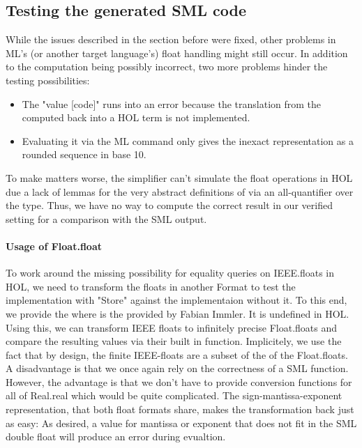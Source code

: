 \documentclass[11pt,a4paper]{article}
\begin{document}
\subsection {Testing the generated SML code}
While the issues described in the section before were fixed, other problems in ML's (or another target language's) float handling might still occur. In addition to the computation being possibly incorrect, two more problems hinder the testing possibilities:
\begin{itemize}
\item The "value [code]" runs into an error because the translation from the computed \MLreal back into a HOL term is not implemented.
\item Evaluating it via the ML command only gives the inexact representation as a rounded sequence in base 10.
\end{itemize}
To make matters worse, the simplifier can't simulate the float operations in HOL due a lack of lemmas for the very abstract definitions of
via an all-quantifier over the \HOLreal type. Thus, we have no way to compute the correct result in our verified setting for a comparison with the SML output.

\paragraph {Usage of Float.float}

To work around the missing possibility for equality queries on IEEE.floats in HOL, we need to transform the floats in another Format to test the implementation with "Store" against the implementaion without it. To this end, we provide the
where
is the
provided by Fabian Immler. It is undefined in HOL. Using this, we can transform IEEE floats to infinitely precise Float.floats and compare the resulting values via their built in
function. Implicitely, we use the fact that by design, the finite IEEE-floats are a subset of the of the Float.floats. A disadvantage is that we once again rely on the correctness of a SML function. However, the advantage is that we don't have to provide conversion functions for all of Real.real which would be quite complicated. The sign-mantissa-exponent representation, that both float formats share, makes the transformation back just as easy:
As desired, a value for mantissa or exponent that does not fit in the SML double float will produce an error during evualtion.
\end{document}
